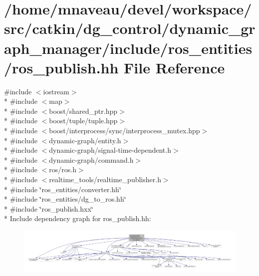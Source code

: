 \hypertarget{ros__publish_8hh}{}\section{/home/mnaveau/devel/workspace/src/catkin/dg\+\_\+control/dynamic\+\_\+graph\+\_\+manager/include/ros\+\_\+entities/ros\+\_\+publish.hh File Reference}
\label{ros__publish_8hh}
{\ttfamily \#include $<$iostream$>$}\\*
{\ttfamily \#include $<$map$>$}\\*
{\ttfamily \#include $<$boost/shared\+\_\+ptr.\+hpp$>$}\\*
{\ttfamily \#include $<$boost/tuple/tuple.\+hpp$>$}\\*
{\ttfamily \#include $<$boost/interprocess/sync/interprocess\+\_\+mutex.\+hpp$>$}\\*
{\ttfamily \#include $<$dynamic-\/graph/entity.\+h$>$}\\*
{\ttfamily \#include $<$dynamic-\/graph/signal-\/time-\/dependent.\+h$>$}\\*
{\ttfamily \#include $<$dynamic-\/graph/command.\+h$>$}\\*
{\ttfamily \#include $<$ros/ros.\+h$>$}\\*
{\ttfamily \#include $<$realtime\+\_\+tools/realtime\+\_\+publisher.\+h$>$}\\*
{\ttfamily \#include \char`\"{}ros\+\_\+entities/converter.\+hh\char`\"{}}\\*
{\ttfamily \#include \char`\"{}ros\+\_\+entities/dg\+\_\+to\+\_\+ros.\+hh\char`\"{}}\\*
{\ttfamily \#include \char`\"{}ros\+\_\+publish.\+hxx\char`\"{}}\\*
Include dependency graph for ros\+\_\+publish.\+hh\+:\nopagebreak
\begin{figure}[H]
\begin{center}
\leavevmode
\includegraphics[width=350pt]{ros__publish_8hh__incl}
\end{center}
\end{figure}

